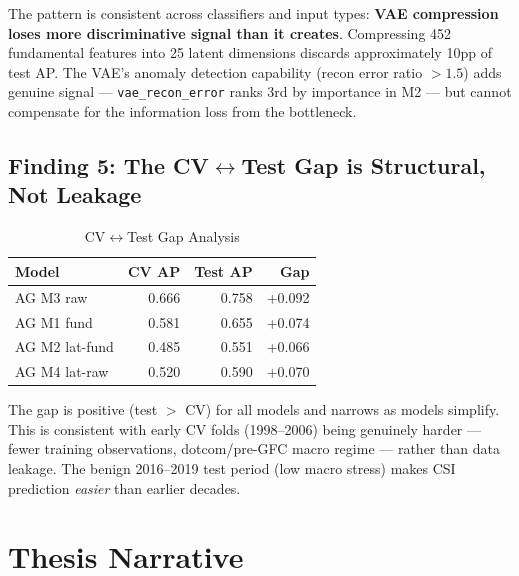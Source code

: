 \documentclass{report}\usepackage[]{graphicx}\usepackage[table]{xcolor}
\begin{document}
\noindent The pattern is consistent across classifiers and input types: 
\textbf{VAE compression loses more discriminative signal than it creates}. 
Compressing 452 fundamental features into 25 latent dimensions discards 
approximately 10pp of test AP. The VAE's anomaly detection capability 
(recon error ratio $> 1.5$) adds genuine signal — 
\texttt{vae\_recon\_error} ranks 3rd by importance in M2 — but cannot 
compensate for the information loss from the bottleneck.

\subsection{Finding 5: The CV$\leftrightarrow$Test Gap is Structural, Not Leakage}

\begin{table}[H]
\centering
\caption{CV$\leftrightarrow$Test Gap Analysis}
\begin{tabular}{lrrr}
\toprule
\textbf{Model} & \textbf{CV AP} & \textbf{Test AP} & \textbf{Gap} \\
\midrule
AG M3 raw      & 0.666 & 0.758 & +0.092 \\
AG M1 fund     & 0.581 & 0.655 & +0.074 \\
AG M2 lat-fund & 0.485 & 0.551 & +0.066 \\
AG M4 lat-raw  & 0.520 & 0.590 & +0.070 \\
\bottomrule
\end{tabular}
\end{table}

\noindent The gap is positive (test $>$ CV) for all models and narrows as 
models simplify. This is consistent with early CV folds (1998--2006) being 
genuinely harder — fewer training observations, dotcom/pre-GFC macro regime — 
rather than data leakage. The benign 2016--2019 test period 
(low macro stress) makes CSI prediction \textit{easier} than earlier decades.

\section{Thesis Narrative}
\end{document}
